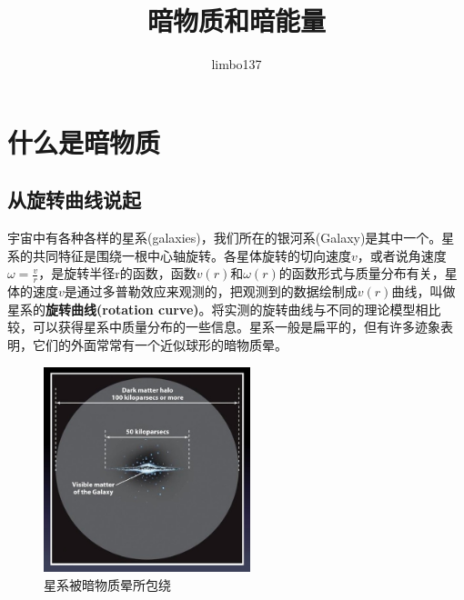 \documentclass[UTF8]{ctexart}
\title{暗物质和暗能量}
\author{limbo137}
\begin{document}
\maketitle
\tableofcontents
\section{什么是暗物质}
\subsection{从旋转曲线说起}
宇宙中有各种各样的星系(galaxies)，我们所在的银河系(Galaxy)是其中一个。星系的共同特征是围绕一根中心轴旋转。各星体旋转的切向速度$v$，或者说角速度$\omega=\frac{v}{r}$，是旋转半径r的函数，函数$v(r)$和$\omega(r)$的函数形式与质量分布有关，星体的速度$v$是通过多普勒效应来观测的，把观测到的数据绘制成$v(r)$曲线，叫做星系的\textbf{旋转曲线(rotation curve)}。将实测的旋转曲线与不同的理论模型相比较，可以获得星系中质量分布的一些信息。星系一般是扁平的，但有许多迹象表明，它们的外面常常有一个近似球形的暗物质晕。
\begin{figure}[H]
    \centering
    \includegraphics[width=6cm]{v2-0eb8fd5dd031f31c2e089a84ae1fab85.jpg}
    \caption{星系被暗物质晕所包绕}
    \label{fig:my_label}
\end{figure}


\end{document}
